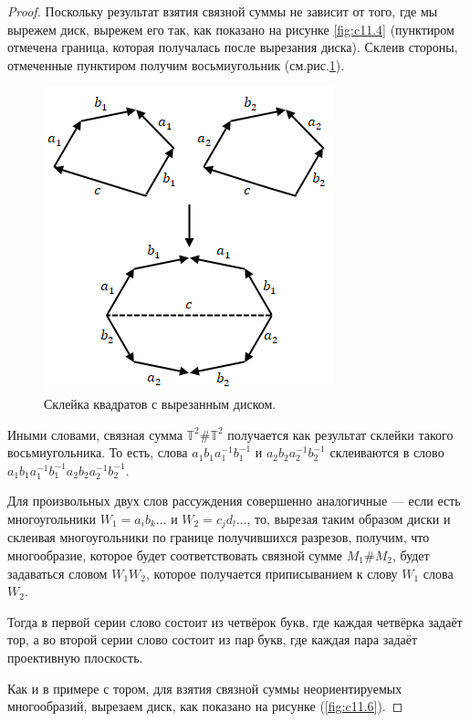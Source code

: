 \begin{proof}
    Поскольку результат взятия связной суммы не зависит от того, где мы вырежем диск, вырежем его так, как показано на рисунке \ref{fig:c11.4} (пунктиром отмечена граница, которая получалась после вырезания диска). Склеив стороны, отмеченные пунктиром получим восьмиугольник (см.рис.\ref{fig:c11.5}).

    \begin{figure}[htbp]
        \centering
        \includegraphics[scale=0.7]{images/c11.5.png}
        \caption{Склейка квадратов с вырезанным диском.}
        \label{fig:c11.5}
    \end{figure}

    Иными словами, связная сумма $\mathbb{T}^2 \# \mathbb{T}^2$ получается как результат склейки такого восьмиугольника. То есть, слова $a_1 b_1 a_1^{-1} b_1^{-1}$ и $a_2 b_2 a_2^{-1} b_2^{-1}$ склеиваются в слово $a_1 b_1 a_1^{-1} b_1^{-1} a_2 b_2 a_2^{-1} b_2^{-1}$.

    Для произвольных двух слов рассуждения совершенно аналогичные — если есть многоугольники $W_1 = a_i b_k \dots$ и $W_2 = c_j d_l \dots$, то, вырезая таким образом диски и склеивая многоугольники по границе получившихся разрезов, получим, что многообразие, которое будет соответствовать связной сумме $M_1 \# M_2$, будет задаваться словом $W_1 W_2$, которое получается приписыванием к слову $W_1$ слова $W_2$.

    Тогда в первой серии слово состоит из четвёрок букв, где каждая четвёрка задаёт тор, а во второй серии слово состоит из пар букв, где каждая пара задаёт проективную плоскость.

    Как и в примере с тором, для взятия связной суммы неориентируемых многообразий, вырезаем диск, как показано на рисунке (\ref{fig:c11.6}).


\end{proof}

